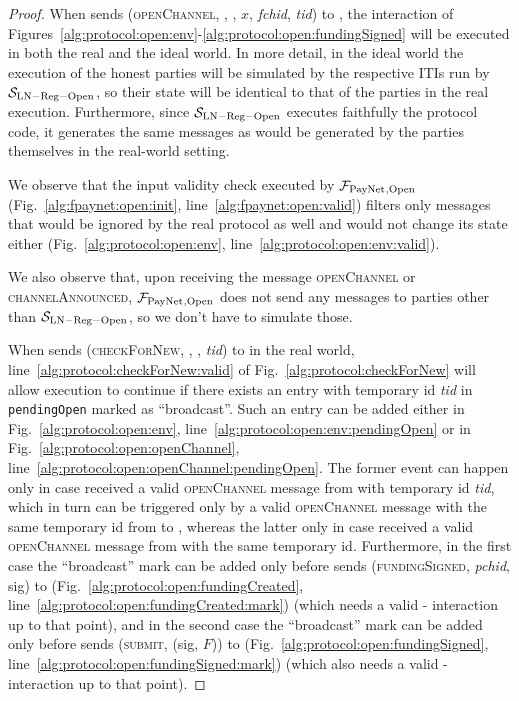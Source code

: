 \begin{proof}
  When \environment{} sends (\textsc{openChannel}, \alice, \bob, $x$,
  \textit{fchid}, \textit{tid}) to \alice, the interaction of
  Figures~\ref{alg:protocol:open:env}-\ref{alg:protocol:open:fundingSigned}
  will be executed in both the real and the ideal world. In more detail, in
  the ideal world the execution of the honest parties will be simulated by the
  respective ITIs run by $\mathcal{S}_{\mathrm{LN - Reg - Open}}$, so their
  state will be identical to that of the parties in the real execution.
  Furthermore, since $\mathcal{S}_{\mathrm{LN - Reg - Open}}$ executes
  faithfully the protocol code, it generates the same messages as would be
  generated by the parties themselves in the real-world setting.

  We observe that the input validity check executed by $\mathcal{F}_{\mathrm{PayNet}}{}_{\mathrm{,
  Open}}$ (Fig.~\ref{alg:fpaynet:open:init}, line~\ref{alg:fpaynet:open:valid})
  filters only messages that would be ignored by the real protocol as well and
  would not change its state either (Fig.~\ref{alg:protocol:open:env},
  line~\ref{alg:protocol:open:env:valid}).

  We also observe that, upon receiving the message \textsc{openChannel} or
  \textsc{channelAnnounced}, $\mathcal{F}_{\mathrm{PayNet}}{}_{\mathrm{, Open}}$ does not send any
  messages to parties other than $\mathcal{S}_{\mathrm{LN - Reg - Open}}$, so we
  don't have to simulate those.

  When \environment{} sends (\textsc{checkForNew}, \alice, \bob, \textit{tid}) to
  \alice{} in the real world, line~\ref{alg:protocol:checkForNew:valid} of
  Fig.~\ref{alg:protocol:checkForNew} will allow execution to continue if there
  exists an entry with temporary id \textit{tid} in \texttt{pendingOpen}
  marked as ``broadcast''. Such an entry can be added either in
  Fig.~\ref{alg:protocol:open:env},
  line~\ref{alg:protocol:open:env:pendingOpen} or in
  Fig.~\ref{alg:protocol:open:openChannel},
  line~\ref{alg:protocol:open:openChannel:pendingOpen}. The former event can
  happen only in case \alice{} received a valid \textsc{openChannel} message
  from \bob{} with temporary id \textit{tid}, which in turn can be triggered
  only by a valid \textsc{openChannel} message with the same temporary id from
  \environment{} to \bob{}, whereas the latter only in case \alice{} received
  a valid \textsc{openChannel} message from \environment{} with the same
  temporary id. Furthermore, in the first case the ``broadcast'' mark can be
  added only before \alice{} sends (\textsc{fundingSigned}, \textit{pchid},
  sig) to \bob{} (Fig.~\ref{alg:protocol:open:fundingCreated},
  line~\ref{alg:protocol:open:fundingCreated:mark}) (which needs a valid
  \alice-\bob{} interaction up to that point), and in the second case the
  ``broadcast'' mark can be added only before \alice{} sends (\textsc{submit},
  (sig, $F$)) to \ledger{} (Fig.~\ref{alg:protocol:open:fundingSigned},
  line~\ref{alg:protocol:open:fundingSigned:mark}) (which also needs a valid
  \alice-\bob{} interaction up to that point).


\end{proof}

